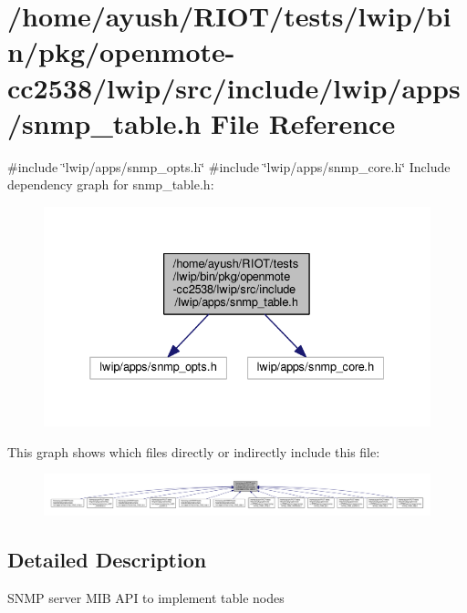 \hypertarget{openmote-cc2538_2lwip_2src_2include_2lwip_2apps_2snmp__table_8h}{}\section{/home/ayush/\+R\+I\+O\+T/tests/lwip/bin/pkg/openmote-\/cc2538/lwip/src/include/lwip/apps/snmp\+\_\+table.h File Reference}
\label{openmote-cc2538_2lwip_2src_2include_2lwip_2apps_2snmp__table_8h}
{\ttfamily \#include \char`\"{}lwip/apps/snmp\+\_\+opts.\+h\char`\"{}}\newline
{\ttfamily \#include \char`\"{}lwip/apps/snmp\+\_\+core.\+h\char`\"{}}\newline
Include dependency graph for snmp\+\_\+table.\+h\+:
\nopagebreak
\begin{figure}[H]
\begin{center}
\leavevmode
\includegraphics[width=332pt]{openmote-cc2538_2lwip_2src_2include_2lwip_2apps_2snmp__table_8h__incl}
\end{center}
\end{figure}
This graph shows which files directly or indirectly include this file\+:
\nopagebreak
\begin{figure}[H]
\begin{center}
\leavevmode
\includegraphics[width=350pt]{openmote-cc2538_2lwip_2src_2include_2lwip_2apps_2snmp__table_8h__dep__incl}
\end{center}
\end{figure}


\subsection{Detailed Description}
S\+N\+MP server M\+IB A\+PI to implement table nodes 